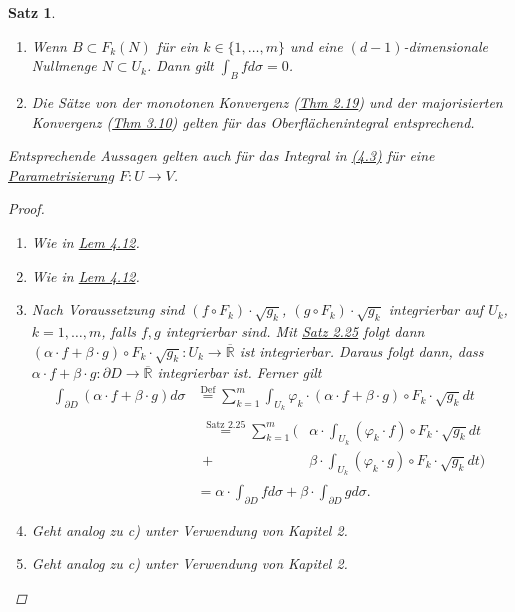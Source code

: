 \documentclass[a4paper]{report}
\newcommand{\R}{\mathbb{R}}
\newcommand{\Rq}{\overline{\R}}
\newcommand{\jlabel}[1]{\label{j_#1}}
\newcommand{\jshortlink}[1]{\jhyperref{#1}{\text{#1}}}
\newcommand{\jhyperref}[2]{\hyperref[j_#1]{#2}}
\newcommand{\jlink}[1]{\jhyperref{#1}{#1}}
\newcommand{\jabb}[3]{ #1: #2 \rightarrow #3 }
\theoremstyle{plain}
\newtheorem{satz}[thm]{Satz}
\theoremstyle{definition}
\begin{document}
{{{{\begin{satz}
\begin{enumerate}
        \item
            \jlabel{Satz 4.14h)}
            Wenn $B\subset F_k(N)$ für ein $k\in \{1,\dots,m\}$ und eine $(d-1)$-dimensionale Nullmenge $N\subset U_k$. Dann gilt $\int_B f d\sigma = 0$.
        \item
            \jlabel{Satz 4.14i)}
            Die Sätze von der monotonen Konvergenz (\jlink{Thm 2.19}) und der majorisierten Konvergenz (\jlink{Thm 3.10}) gelten für das Oberflächenintegral entsprechend.
    \end{enumerate}
    Entsprechende Aussagen gelten auch für das Integral in \jlink{(4.3)} für eine \jlink{Parametrisierung} $\jabb{F}{U}{V}$.
    \begin{proof}
        \begin{enumerate}
            \item Wie in \jlink{Lem 4.12}.
            \item Wie in \jlink{Lem 4.12}.
            \item
                Nach Voraussetzung sind $(f\circ F_k)\cdot \sqrt{g_k}$, $(g\circ F_k)\cdot \sqrt{g_k}$ integrierbar auf $U_k$, $k=1,\dots,m$, falls $f,g$ integrierbar sind. Mit \jlink{Satz 2.25} folgt dann $\jabb{(\alpha\cdot f + \beta\cdot g)\circ F_k\cdot \sqrt{g_k}}{U_k}{\Rq}$ ist integrierbar. Daraus folgt dann, dass $\jabb{\alpha\cdot f + \beta\cdot g}{\partial D}{\Rq}$ integrierbar ist. Ferner gilt
                \[
                    \begin{split}
                        \int_{\partial D} (\alpha\cdot f + \beta\cdot g) d\sigma &\overset{\text{Def}}{=} \sum_{k=1}^m \int_{U_k} \varphi_k\cdot(\alpha\cdot f + \beta\cdot g)\circ F_k \cdot \sqrt{g_k} dt\\
                        &\begin{split} 
                            \overset{\jshortlink{Satz 2.25}}{=}\sum_{k=1}^m (&\alpha\cdot \int_{U_k}(\varphi_k\cdot f)\circ F_k\cdot \sqrt{g_k}dt\\
                            + &\beta\cdot \int_{U_k}(\varphi_k\cdot g)\circ F_k\cdot \sqrt{g_k} dt  )
                        \end{split}\\
                        &=\alpha\cdot \int_{\partial D} f d\sigma + \beta \cdot \int_{\partial D} g d\sigma.
                    \end{split}
                \]
            \item Geht analog zu c) unter Verwendung von Kapitel 2.
            \item Geht analog zu c) unter Verwendung von Kapitel 2.
            

\end{enumerate}
\end{proof}
\end{satz}}}}}
\end{document}
